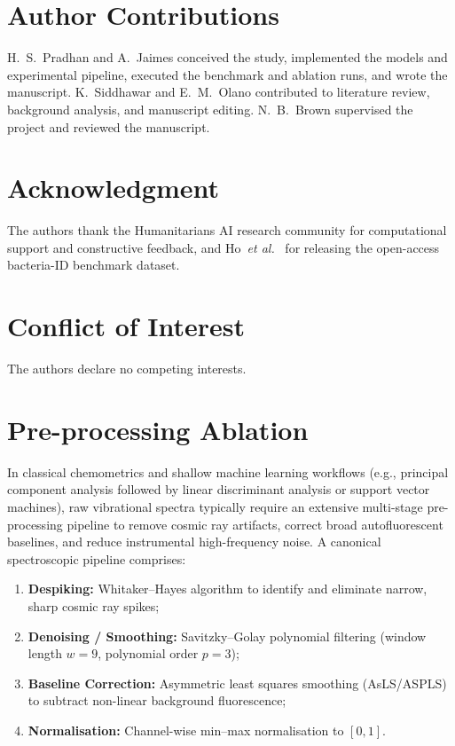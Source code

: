 \documentclass[journal,onecolumn]{IEEEtran}
\begin{document}
\section*{Author Contributions}
H.~S.~Pradhan and A.~Jaimes conceived the study, implemented the models and
experimental pipeline, executed the benchmark and ablation runs, and wrote the
manuscript. K.~Siddhawar and E.~M.~Olano contributed to literature review,
background analysis, and manuscript editing. N.~B.~Brown supervised the project
and reviewed the manuscript.

\section*{Acknowledgment}
The authors thank the Humanitarians AI research community for computational
support and constructive feedback, and Ho~\textit{et al.}\ \cite{ho2019rapid}
for releasing the open-access bacteria-ID benchmark dataset.

\section*{Conflict of Interest}
The authors declare no competing interests.




\appendices
\section{Pre-processing Ablation}
\label{app:preproc}

In classical chemometrics and shallow machine learning workflows (e.g.,
principal component analysis followed by linear discriminant analysis or
support vector machines), raw vibrational spectra typically require an extensive
multi-stage pre-processing pipeline to remove cosmic ray artifacts, correct
broad autofluorescent baselines, and reduce instrumental high-frequency noise.
A canonical spectroscopic pipeline comprises:
\begin{enumerate}
  \item \textbf{Despiking:} Whitaker--Hayes algorithm \cite{whitaker2018simple} to identify and eliminate
        narrow, sharp cosmic ray spikes;
  \item \textbf{Denoising / Smoothing:} Savitzky--Golay polynomial filtering \cite{savitzky1964smoothing}
        (window length $w=9$, polynomial order $p=3$);
  \item \textbf{Baseline Correction:} Asymmetric least squares smoothing
        (AsLS/ASPLS) \cite{zhang2020baseline} to subtract non-linear background fluorescence;
  \item \textbf{Normalisation:} Channel-wise min--max normalisation to $[0, 1]$.
\end{enumerate}
\end{document}
